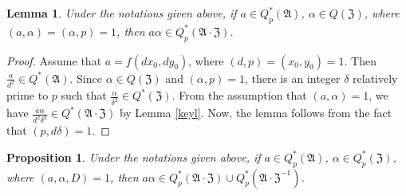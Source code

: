 \documentclass{amsart}
\newtheorem{lem}[thm]{Lemma}
\newtheorem{prop}[thm]{Proposition}
\theoremstyle{definition}
\theoremstyle{remark}
\numberwithin{equation}{section}
\begin{document}
\begin{lem}  \label{tekl}  Under the notations given above, if $a \in Q_p^*(\mathfrak A)$, $\alpha \in Q(\mathfrak Z)$,  where $(a,\alpha)=(\alpha,p)=1$, then $a\alpha \in Q_p^*(\mathfrak A\cdot\mathfrak Z)$.\end{lem}

\begin{proof}  Assume that $a=f(dx_0,dy_0)$, where $(d,p)=(x_0,y_0)=1$. Then $\frac a{d^2} \in Q^*(\mathfrak A)$. Since $\alpha \in Q(\mathfrak Z)$ and $(\alpha,p)=1$, there is an integer $\delta$ relatively prime to $p$ such that $\frac \alpha{\delta^2} \in Q^*(\mathfrak Z)$. From the assumption that $(a,\alpha)=1$, we have $\frac {a\alpha}{d^2\delta^2} \in Q^*(\mathfrak A\cdot\mathfrak Z)$ by Lemma \ref{keyl}. Now, the lemma follows from the fact that $(p,d\delta)=1$. 
\end{proof}

\begin{prop} \label{keyp}   Under the notations given above, if $a \in Q_p^*(\mathfrak A)$, $\alpha \in Q_p^*(\mathfrak Z)$,  where $(a,\alpha,D)=1$, then $a\alpha \in Q_p^*(\mathfrak A\cdot\mathfrak Z) \cup Q_p^*(\mathfrak A\cdot\mathfrak Z^{-1})$.  \end{prop}
\end{document}

